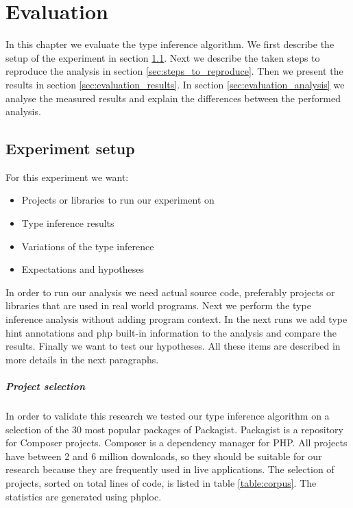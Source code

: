 \documentclass[../main.tex]{subfiles}
\begin{document}
    \chapter{Evaluation}\label{ch:evaluation}
	In this chapter we evaluate the type inference algorithm.
	We first describe the setup of the experiment in section \ref{sec:evaluation_experiment_setup}.
	Next we describe the taken steps to reproduce the analysis in section \ref{sec:steps_to_reproduce}.
	Then we present the results in section \ref{sec:evaluation_results}.
	In section \ref{sec:evaluation_analysis} we analyse the measured results and explain the differences between the performed analysis.
	
	\section{Experiment setup}\label{sec:evaluation_experiment_setup}
	
	For this experiment we want:
	\begin{itemize}
		\item Projects or libraries to run our experiment on
		\item Type inference results
		\item Variations of the type inference
		\item Expectations and hypotheses
	\end{itemize}
	In order to run our analysis we need actual source code, preferably projects or libraries that are used in real world programs.
	Next we perform the type inference analysis without adding program context.
	In the next runs we add type hint annotations and php built-in information to the analysis and compare the results.
	Finally we want to test our hypotheses.
	All these items are described in more details in the next paragraphs.
	
	\paragraph{Project selection}
	In order to validate this research we tested our type inference algorithm on a selection of the 30 most popular packages of Packagist\footnotemark.
	Packagist is a repository for Composer\footnotemark{} projects.
	Composer is a dependency manager for PHP.
	All projects have between 2 and 6 million downloads, so they should be suitable for our research because they are frequently used in live applications.
	The selection of projects, sorted on total lines of code, is listed in table \ref{table:corpus}.
	The statistics are generated using phploc\footnotemark.
\end{document}
